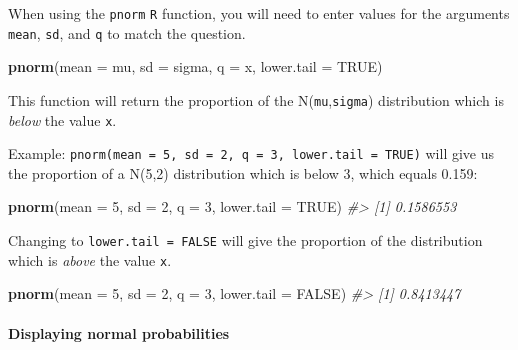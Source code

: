 \documentclass[
]{report}
\newenvironment{Shaded}{\begin{snugshade}}{\end{snugshade}}
\newcommand{\CommentTok}[1]{\textcolor[rgb]{0.56,0.35,0.01}{\textit{#1}}}
\newcommand{\DataTypeTok}[1]{\textcolor[rgb]{0.13,0.29,0.53}{#1}}
\newcommand{\DecValTok}[1]{\textcolor[rgb]{0.00,0.00,0.81}{#1}}
\newcommand{\KeywordTok}[1]{\textcolor[rgb]{0.13,0.29,0.53}{\textbf{#1}}}
\newcommand{\NormalTok}[1]{#1}
\newcommand{\OtherTok}[1]{\textcolor[rgb]{0.56,0.35,0.01}{#1}}
\begin{document}
When using the \texttt{pnorm} \texttt{R} function, you will need to enter values for the arguments \texttt{mean}, \texttt{sd}, and \texttt{q} to match the question.

\begin{Shaded}
\begin{Highlighting}[]
\KeywordTok{pnorm}\NormalTok{(}\DataTypeTok{mean =}\NormalTok{ mu, }\DataTypeTok{sd =}\NormalTok{ sigma, }\DataTypeTok{q =}\NormalTok{ x, }\DataTypeTok{lower.tail =} \OtherTok{TRUE}\NormalTok{)}
\end{Highlighting}
\end{Shaded}

This function will return the proportion of the N(\texttt{mu},\texttt{sigma}) distribution which is \emph{below} the value \texttt{x}.

Example: \texttt{pnorm(mean\ =\ 5,\ sd\ =\ 2,\ q\ =\ 3,\ lower.tail\ =\ TRUE)} will give us the proportion of a N(5,2) distribution which is below 3, which equals 0.159:

\begin{Shaded}
\begin{Highlighting}[]
\KeywordTok{pnorm}\NormalTok{(}\DataTypeTok{mean =} \DecValTok{5}\NormalTok{, }\DataTypeTok{sd =} \DecValTok{2}\NormalTok{, }\DataTypeTok{q =} \DecValTok{3}\NormalTok{, }\DataTypeTok{lower.tail =} \OtherTok{TRUE}\NormalTok{)}
\CommentTok{\#\textgreater{} [1] 0.1586553}
\end{Highlighting}
\end{Shaded}

Changing to \texttt{lower.tail\ =\ FALSE} will give the proportion of the distribution which is \emph{above} the value \texttt{x}.

\begin{Shaded}
\begin{Highlighting}[]
\KeywordTok{pnorm}\NormalTok{(}\DataTypeTok{mean =} \DecValTok{5}\NormalTok{, }\DataTypeTok{sd =} \DecValTok{2}\NormalTok{, }\DataTypeTok{q =} \DecValTok{3}\NormalTok{, }\DataTypeTok{lower.tail =} \OtherTok{FALSE}\NormalTok{)}
\CommentTok{\#\textgreater{} [1] 0.8413447}
\end{Highlighting}
\end{Shaded}

\hypertarget{displaying-normal-probabilities}{%
\paragraph*{Displaying normal probabilities}\label{displaying-normal-probabilities}}
\end{document}
